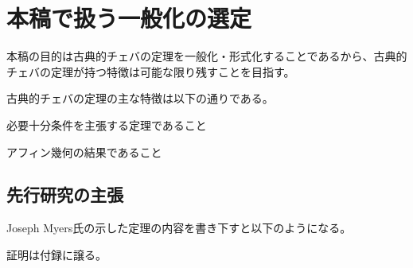 \documentclass[a4paper,12pt]{bxjsbook}
\newlength{\customindent}
\newenvironment{body}{
  \par
  \begingroup
  \setlength{\leftskip}{\customindent}
  \setlength{\rightskip}{0pt}
  \setlength{\parindent}{1em}
  \setlength{\displayindent}{\customindent}
  \setlength{\displaywidth}{\dimexpr\linewidth-\customindent\relax}
}{
  \par
  \endgroup
}
\theoremstyle{theorem}
\begin{document}
    \section{本稿で扱う一般化の選定}
    \begin{body}
        \indent 本稿の目的は古典的チェバの定理を一般化・形式化することであるから、古典的チェバの定理が持つ特徴は可能な限り残すことを目指す。

        \indent 古典的チェバの定理の主な特徴は以下の通りである。
        \begin{bodyitemize}
           \item 必要十分条件を主張する定理であること
           \item アフィン幾何の結果であること
           \item 
        \end{bodyitemize}

    \subsection{先行研究の主張}

    \begin{body}
        \indent Joseph Myers氏の示した定理の内容を書き下すと以下のようになる。
        
        \indent 証明は付録に譲る。
    \end{body}


\end{body}
\end{document}
